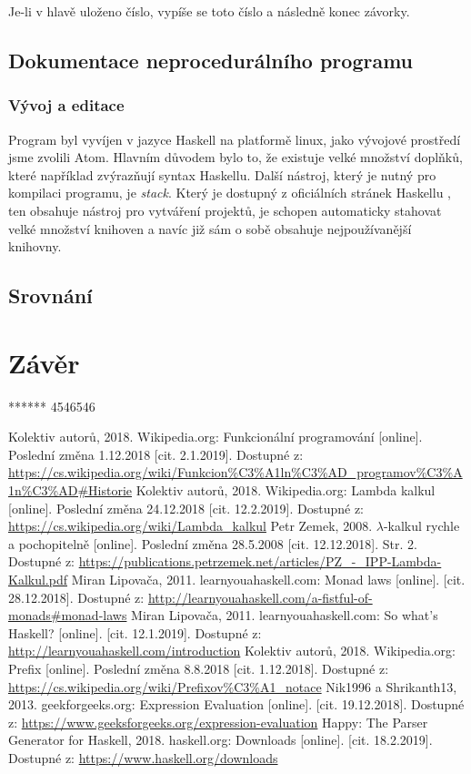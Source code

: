 \documentclass[12pt,a4paper]{report}
\begin{document}
Je-li v hlavě uloženo číslo, vypíše se toto číslo a následně konec závorky.

\section{Dokumentace neprocedurálního programu}
\subsection{Vývoj a editace}
Program byl vyvíjen v jazyce Haskell na platformě linux, jako vývojové prostředí jsme zvolili Atom. Hlavním důvodem bylo to, že existuje velké množství doplňků, které například zvýrazňují syntax Haskellu. Další nástroj, který je nutný pro kompilaci programu, je \textit{stack}. Který je dostupný z oficiálních stránek Haskellu \cite{stack}, ten obsahuje nástroj pro vytváření projektů, je schopen automaticky stahovat velké množství knihoven a navíc již sám o sobě obsahuje nejpoužívanější knihovny.   


\section{Srovnání}

\chapter{Závěr}
****** 4546546 

\begin{thebibliography}{99}

Kolektiv autorů, 2018. Wikipedia.org: Funkcionální programování [online]. Poslední změna 1.12.2018 [cit. 2.1.2019]. Dostupné z: \url{https://cs.wikipedia.org/wiki/Funkcion%C3%A1ln%C3%AD_programov%C3%A1n%C3%AD#Historie}  
Kolektiv autorů, 2018. Wikipedia.org: Lambda kalkul [online]. Poslední změna 24.12.2018 [cit. 12.2.2019]. Dostupné z: \url{https://cs.wikipedia.org/wiki/Lambda_kalkul}
Petr Zemek, 2008. $\lambda$-kalkul rychle a pochopitelně [online]. Poslední změna 28.5.2008 [cit. 12.12.2018]. Str. 2. Dostupné z: \url{https://publications.petrzemek.net/articles/PZ_-_IPP-Lambda-Kalkul.pdf}
Miran Lipovača, 2011. learnyouahaskell.com: Monad laws [online]. [cit. 28.12.2018]. Dostupné z: \url{http://learnyouahaskell.com/a-fistful-of-monads#monad-laws}
Miran Lipovača, 2011. learnyouahaskell.com: So what's Haskell? [online]. [cit. 12.1.2019]. Dostupné z: \url{http://learnyouahaskell.com/introduction}
Kolektiv autorů, 2018. Wikipedia.org: Prefix [online]. Poslední změna 8.8.2018 [cit. 1.12.2018]. Dostupné z: \url{https://cs.wikipedia.org/wiki/Prefixov%C3%A1_notace}
Nik1996 a Shrikanth13, 2013. geekforgeeks.org: Expression Evaluation [online].  [cit. 19.12.2018]. Dostupné z: \url{https://www.geeksforgeeks.org/expression-evaluation}
Happy: The Parser Generator for Haskell, 2018. haskell.org: Downloads [online].  [cit. 18.2.2019]. Dostupné z: \url{https://www.haskell.org/downloads}
\end{thebibliography}
\end{document}
